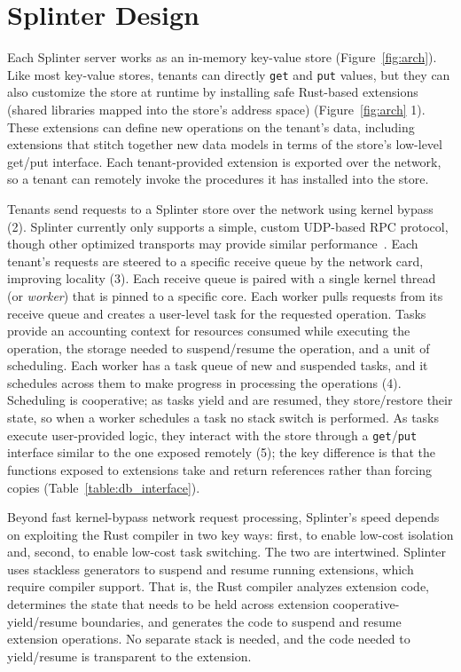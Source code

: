 \section{Splinter Design}
\label{sec:design}

Each Splinter server works as an in-memory key-value store
  (Figure~\ref{fig:arch}).
Like most key-value stores, tenants can directly \texttt{get} and \texttt{put} values, but they can also customize the
  store at runtime by installing safe Rust-based extensions (shared libraries mapped into the store's address space) (Figure~\ref{fig:arch} \textcircled{\footnotesize{1}}).
These extensions can define new operations on the tenant's data, including
  extensions that stitch together new data models in terms of the store's
  low-level get/put interface.
Each tenant-provided extension is exported over the network, so
  a tenant can remotely invoke the procedures it has installed into the store.

Tenants send requests to a Splinter store over the
  network using kernel bypass (\textcircled{\footnotesize{2}}).
Splinter currently only supports a simple, custom UDP-based RPC
  protocol, though other optimized transports may provide similar performance~\cite{erpc-arxiv}.
Each tenant's requests are steered to a specific receive queue by the
network
  card, improving locality (\textcircled{\footnotesize{3}}).
Each receive queue is paired with a single kernel thread (or {\sl worker}) that is pinned to a specific core.
Each worker pulls requests from its receive queue and creates a
user-level task for the requested operation.
Tasks provide an accounting
context for resources consumed while executing the
  operation, the storage needed to suspend/resume the
  operation, and a unit of scheduling.
Each worker has a task queue of new and suspended tasks, and it
  schedules across them to make progress in processing the operations
  (\textcircled{\footnotesize{4}}).
Scheduling is cooperative; as tasks yield and are resumed, they
store/restore their state, so when a worker
  schedules a task no stack switch is performed.
As tasks execute user-provided logic, they interact with the store through
  a \texttt{get}/\texttt{put} interface similar to the one exposed
  remotely (\textcircled{\footnotesize{5}});
the key difference is that the functions exposed to extensions
  take and return references rather than forcing copies (Table~\ref{table:db_interface}).

Beyond fast kernel-bypass network request processing, Splinter's speed depends on exploiting
  the Rust compiler in two key ways: first, to enable low-cost
  isolation and, second, to enable low-cost task switching.
The two are intertwined.
Splinter uses stackless generators to suspend and resume running
  extensions, which require compiler support.
That is, the Rust compiler analyzes extension code, determines the state that
  needs to be held across extension cooperative-yield/resume boundaries, and generates the
  code to suspend and resume extension operations.
No separate stack is needed, and the code needed to yield/resume is transparent
  to the extension.

